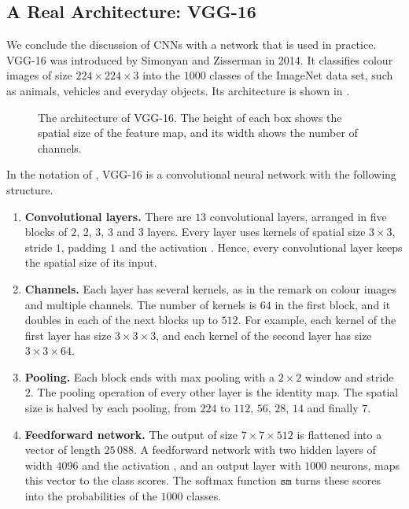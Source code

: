 \subsection{A Real Architecture: VGG-16}\label{vgg16.subs}
We conclude the discussion of CNNs with a network that is used in practice. VGG-16 was introduced by Simonyan and Zisserman in 2014. It classifies colour images of size $224\times224\times3$ into the $1000$ classes of the ImageNet data set, such as animals, vehicles and everyday objects. Its architecture is shown in .
\begin{figure}[ht]
\begin{center}

\end{center}
\caption{The architecture of VGG-16. The height of each box shows the spatial size of the feature map, and its width shows the number of channels.}\label{vgg16.fig}
\end{figure}
In the notation of , VGG-16 is a convolutional neural network with the following structure.
\begin{enumerate}
\item \textbf{Convolutional layers.} There are $13$ convolutional layers, arranged in five blocks of $2$, $2$, $3$, $3$ and $3$ layers. Every layer uses kernels of spatial size $3\times3$, stride $1$, padding $1$ and the activation \ReLU. Hence, every convolutional layer keeps the spatial size of its input.
\item \textbf{Channels.} Each layer has several kernels, as in the remark on colour images and multiple channels. The number of kernels is $64$ in the first block, and it doubles in each of the next blocks up to $512$. For example, each kernel of the first layer has size $3\times3\times3$, and each kernel of the second layer has size $3\times3\times64$.
\item \textbf{Pooling.} Each block ends with max pooling with a $2\times2$ window and stride $2$. The pooling operation of every other layer is the identity map. The spatial size is halved by each pooling, from $224$ to $112$, $56$, $28$, $14$ and finally $7$.
\item \textbf{Feedforward network.} The output of size $7\times7\times512$ is flattened into a vector of length $25\,088$. A feedforward network with two hidden layers of width $4096$ and the activation \ReLU, and an output layer with $1000$ neurons, maps this vector to the class scores. The softmax function $\texttt{sm}$ turns these scores into the probabilities of the $1000$ classes.
\end{enumerate}
